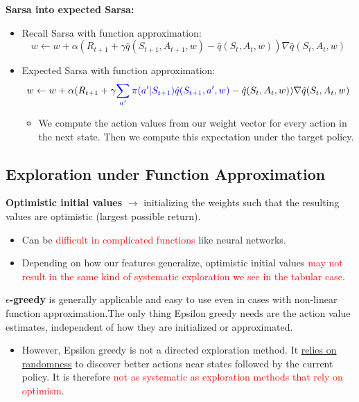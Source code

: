 \documentclass[12pt, a4paper]{article}
\begin{document}
\textbf{Sarsa into expected Sarsa:}

\begin{itemize}
  \item Recall Sarsa with function approximation:
  $$
  w \leftarrow w + \alpha (R_{t+1} + \gamma \hat{q}(S_{t+1},A_{t+1},w)- \hat{q}(S_t,A_t,w)) \nabla \hat{q}(S_t,A_t,w)
  $$
  \item Expected Sarsa with function approximation:
  $$
  w \leftarrow w + \alpha (R_{t+1} + \gamma \textcolor{blue}{\sum_{a'} \pi(a' | S_{t+1}) \hat{q}(S_{t+1}, a',w)} - \hat{q}(S_t,A_t,w)) \nabla \hat{q}(S_t,A_t,w)
  $$
  \begin{itemize}
    \item We compute the action values from our weight vector for every action in the next state. Then we compute this expectation under the target policy.
  \end{itemize}
\end{itemize}









\subsection{Exploration under Function Approximation}\label{exploration-under-function-approximation}

\textbf{Optimistic initial values} $\rightarrow$ initializing the weights such that the resulting values are optimistic (largest possible return).
\begin{itemize}
  \item Can be \textcolor{red}{difficult in complicated functions} like neural networks.
  \item Depending on how our features generalize, optimistic initial values \textcolor{red}{may not result in the same kind of systematic exploration we see in the tabular case}.
\end{itemize}

\textbf{$\epsilon$-greedy} is generally applicable and easy to use even in cases with non-linear function approximation.The only thing Epsilon greedy needs are the action value estimates, independent of how they are initialized or approximated.
\begin{itemize}
  \item However, Epsilon greedy is not a directed exploration method. It \uline{relies on randomness} to discover better actions near states followed by the current policy. It is therefore \textcolor{red}{not as systematic as exploration methods that rely on optimism}.
\end{itemize}
\end{document}
